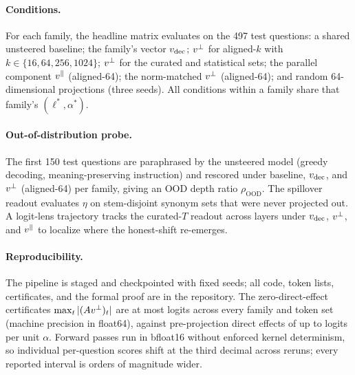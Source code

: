 \paragraph{Conditions.}
For each family, the headline matrix evaluates on the 497 test questions: a shared unsteered baseline; the family's vector $v_{\mathrm{dec}}$; $v^{\perp}$ for aligned-$k$ with $k \in \{16, 64, 256, 1024\}$; $v^{\perp}$ for the curated and statistical sets; the parallel component $v^{\parallel}$ (aligned-64); the norm-matched $v^{\perp}$ (aligned-64); and random 64-dimensional projections (three seeds). All conditions within a family share that family's $(\ell^{*}, \alpha^{*})$.

\paragraph{Out-of-distribution probe.}
The first 150 test questions are paraphrased by the unsteered model (greedy decoding, meaning-preserving instruction) and rescored under baseline, $v_{\mathrm{dec}}$, and $v^{\perp}$ (aligned-64) per family, giving an OOD depth ratio $\rho_{\mathrm{OOD}}$. The spillover readout evaluates $\eta$ on stem-disjoint synonym sets that were never projected out. A logit-lens trajectory \citep{nostalgebraist2020logitlens} tracks the curated-$T$ readout across layers under $v_{\mathrm{dec}}$, $v^{\perp}$, and $v^{\parallel}$ to localize where the honest-shift re-emerges.

\paragraph{Reproducibility.}
The pipeline is staged and checkpointed with fixed seeds; all code, token lists, certificates, and the formal proof are in the repository. The zero-direct-effect certificates $\max_t |(Av^{\perp})_t|$ are at most \CertWorst{} logits across every family and token set (machine precision in float64), against pre-projection direct effects of up to \CertPre{} logits per unit $\alpha$. Forward passes run in bfloat16 without enforced kernel determinism, so individual per-question scores shift at the third decimal across reruns; every reported interval is orders of magnitude wider.
